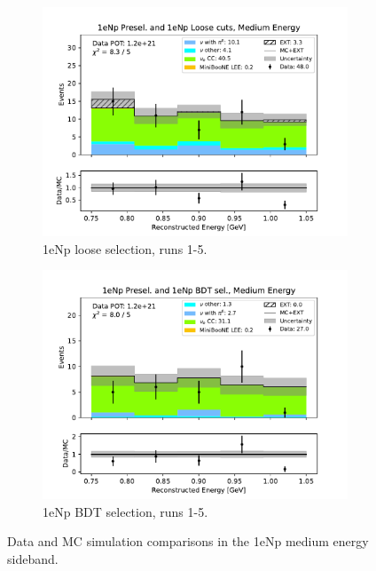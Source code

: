 \begin{figure}[H]
    \begin{subfigure}{0.33\linewidth}
        \includegraphics[width=\linewidth]{technote/Sidebands/Figures/NearSideband/near_sideband_reco_e_run1234a4b4c4d5_NP_NPL_MEDIUM_ENERGY.pdf}
        \caption{1eNp loose selection, runs 1-5.}
    \end{subfigure}%
    \begin{subfigure}{0.33\linewidth}
        \includegraphics[width=\linewidth]{technote/Sidebands/Figures/NearSideband/near_sideband_reco_e_run1234a4b4c4d5_NP_NPBDT_MEDIUM_ENERGY.pdf}
        \caption{1eNp BDT selection, runs 1-5.}
    \end{subfigure}
    \caption{Data and MC simulation comparisons in the 1eNp medium energy sideband.}
\end{figure}

